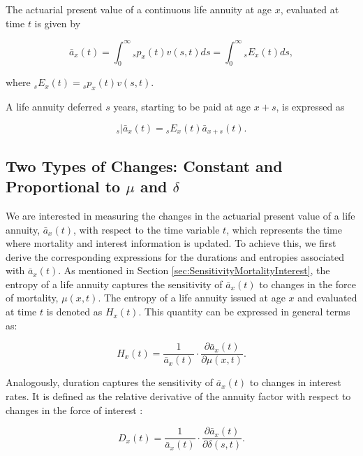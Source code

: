 \documentclass[12pt]{article}
\begin{document}
The actuarial present value of a continuous life annuity at age $x$, evaluated at time $t$ is given by

\begin{equation}\label{eq:Annuity}
\bar{a}_x(t) = \int_0^\infty {}_sp_x(t) {v}(s,t)ds = \int_0^\infty {}_sE_x(t) ds,
\end{equation}

where ${}_sE_x(t)={}_sp_x(t) {v}(s,t)$. 

A life annuity deferred $s$ years, starting to be paid at age $x+s$, is expressed as

\begin{equation}\label{eq:DefAnnuity}
{}_s|\bar{a}_x(t) = {}_sE_x(t) \bar{a}_{x+s}(t).
\end{equation}


\subsection{Two Types of Changes: Constant and Proportional to $\mu$ and $\delta$}


We are interested in measuring the changes in the actuarial present value of a life annuity, \( \bar{a}_x(t) \), with respect to the time variable \( t \), which represents the time where mortality and interest information is updated. To achieve this, we first derive the corresponding expressions for the durations and entropies associated with \( \bar{a}_x(t) \). As mentioned in Section \ref{sec:SensitivityMortalityInterest}, the entropy of a life annuity captures the sensitivity of \( \bar{a}_x(t) \) to changes in the force of mortality, \( \mu(x,t) \). The entropy of a life annuity issued at age \( x \) and evaluated at time \( t \) is denoted as \( H_x(t) \). This quantity can be expressed in general terms as:

\begin{equation}\label{eq:EntropyGeneral}
{H}_{x}(t) = \frac{ 1}{\bar{a}_x(t)}\cdot \frac{\partial \bar{a}_x(t) }{\partial \mu(x,t)}.
\end{equation}

Analogously, duration captures the sensitivity of $\bar{a}_x(t)$ to changes in interest rates. It is defined as the relative derivative of the annuity factor with respect to changes in the force of interest \citep{Milevsky2012,Milevsky2012a}:


\begin{equation}\label{eq:DurationGeneral}
{D}_{x}(t) = \frac{1}{\bar{a}_x(t)}\cdot  \frac{\partial \bar{a}_x(t) }{\partial \delta(s,t)}.
\end{equation}
\end{document}
